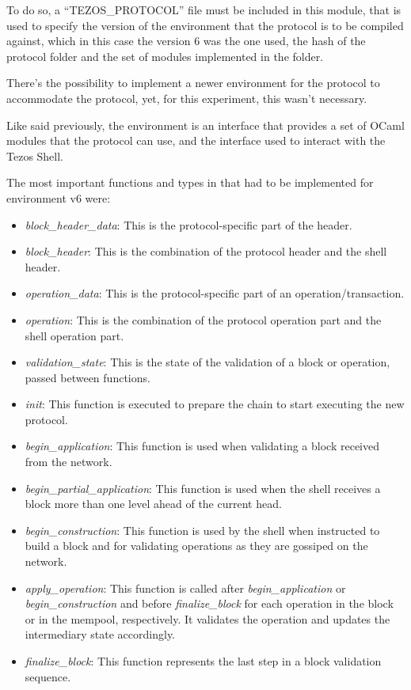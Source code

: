 To do so, a ``TEZOS\_PROTOCOL'' file must be included in this module, that is used to specify the version of the environment that the protocol is to be compiled against, which in this case the version 6 was the one used, the hash of the protocol folder and the set of modules implemented in the folder. 

There's the possibility to implement a newer environment for the protocol to accommodate the protocol, yet, for this experiment, this wasn't necessary. 

Like said previously, the environment is an interface that provides a set of OCaml modules that the protocol can use, and the interface used to interact with the Tezos Shell.

The most important functions and types in that had to be implemented for environment v6 were:

\begin{itemize}
    \item \emph{block\_header\_data}: This is the protocol-specific part of the header.
    \item \emph{block\_header}: This is the combination of the protocol header and the shell header.
    \item \emph{operation\_data}: This is the protocol-specific part of an operation/transaction.
    \item \emph{operation}: This is the combination of the protocol operation part and the shell operation part.
    \item \emph{validation\_state}: This is the state of the validation of a block or operation, passed between functions.
    \item \emph{init}: This function is executed to prepare the chain to start executing the new protocol.
    \item \emph{begin\_application}: This function is used when validating a block received from the network.
    \item \emph{begin\_partial\_application}: This function is used when the shell receives a block more than one level ahead of the current head. 
    \item \emph{begin\_construction}: This function is used by the shell when instructed to build a block and for validating operations as they are gossiped on the network.
    \item \emph{apply\_operation}: This function is called after \emph{begin\_application} or \emph{begin\_construction} and before \emph{finalize\_block} for each operation in the block or in the mempool, respectively. It validates the operation and updates the intermediary state accordingly.
    \item \emph{finalize\_block}: This function represents the last step in a block validation sequence.
\end{itemize}

